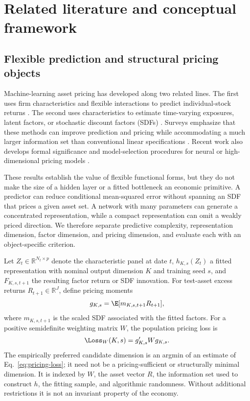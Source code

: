 \section{Related literature and conceptual framework}

\subsection{Flexible prediction and structural pricing objects}

Machine-learning asset pricing has developed along two related lines. The first uses firm characteristics and flexible interactions to predict individual-stock returns \citep{gu2020empirical,avramov2023machine,leippold2022machine}. The second uses characteristics to estimate time-varying exposures, latent factors, or stochastic discount factors (SDFs) \citep{kelly2019characteristics,gu2021autoencoder,chen2024deep,feng2024deep}. Surveys emphasize that these methods can improve prediction and pricing while accommodating a much larger information set than conventional linear specifications \citep{giglio2022factor,bagnara2024review,karolyi2020new}. Recent work also develops formal significance and model-selection procedures for neural or high-dimensional pricing models \citep{fallahgoul2024significance,feng2026stepwise}.

These results establish the value of flexible functional forms, but they do not make the size of a hidden layer or a fitted bottleneck an economic primitive. A predictor can reduce conditional mean-squared error without spanning an SDF that prices a given asset set. A network with many parameters can generate a concentrated representation, while a compact representation can omit a weakly priced direction. We therefore separate predictive complexity, representation dimension, factor dimension, and pricing dimension, and evaluate each with an object-specific criterion.

Let $Z_t\in\mathbb{R}^{N_t\times p}$ denote the characteristic panel at date $t$, $h_{K,s}(Z_t)$ a fitted representation with nominal output dimension $K$ and training seed $s$, and $F_{K,s,t+1}$ the resulting factor return or SDF innovation. For test-asset excess returns $R_{t+1}\in\mathbb{R}^{J}$, define pricing moments
\begin{equation}
 g_{K,s}=\E[m_{K,s,t+1}R_{t+1}],
\end{equation}
where $m_{K,s,t+1}$ is the scaled SDF associated with the fitted factors. For a positive semidefinite weighting matrix $W$, the population pricing loss is
\begin{equation}
 \Loss_W(K,s)=g_{K,s}'Wg_{K,s}.
 \label{eq:pricing-loss}
\end{equation}
The empirically preferred candidate dimension is an argmin of an estimate of Eq.~\eqref{eq:pricing-loss}; it need not be a pricing-sufficient or structurally minimal dimension. It is indexed by $W$, the asset vector $R$, the information set used to construct $h$, the fitting sample, and algorithmic randomness. Without additional restrictions it is not an invariant property of the economy.

